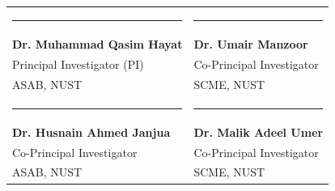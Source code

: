 \documentclass[12pt,a4paper]{report}
\begin{document}
\noindent
\begin{tabularx}{\textwidth}{X X}
    \rule{0.85\linewidth}{0.6pt} & \rule{0.85\linewidth}{0.6pt} \\
    \textbf{Dr. Muhammad Qasim Hayat} & \textbf{Dr. Umair Manzoor} \\
    Principal Investigator (PI) & Co-Principal Investigator \\
    ASAB, NUST & SCME, NUST \\[2.5cm]
    
    \rule{0.85\linewidth}{0.6pt} & \rule{0.85\linewidth}{0.6pt} \\
    \textbf{Dr. Husnain Ahmed Janjua} & \textbf{Dr. Malik Adeel Umer} \\
    Co-Principal Investigator & Co-Principal Investigator \\
    ASAB, NUST & SCME, NUST \\
\end{tabularx}

\clearpage

\tableofcontents
\clearpage
\listoffigures
\clearpage
\listoftables
\clearpage

\setcounter{page}{1}







\end{document}
